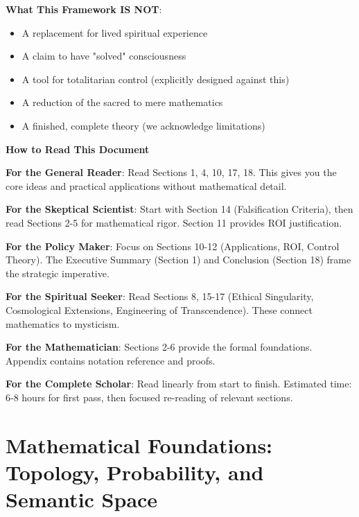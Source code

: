 \documentclass[11pt,a4paper]{article}
\theoremstyle{definition}
\theoremstyle{remark}
\begin{document}
\begin{small}
\begin{mdframed}[backgroundcolor=blue!5,linewidth=2pt]
\vspace{0.5em}

\textbf{What This Framework IS NOT}:
\begin{itemize}[nosep]
    \item A replacement for lived spiritual experience
    \item A claim to have "solved" consciousness
    \item A tool for totalitarian control (explicitly designed against this)
    \item A reduction of the sacred to mere mathematics
    \item A finished, complete theory (we acknowledge limitations)
\end{itemize}
\end{mdframed}

\begin{mdframed}[backgroundcolor=yellow!10,linewidth=2pt]
\textbf{How to Read This Document}

\textbf{For the General Reader}: Read Sections 1, 4, 10, 17, 18. This gives you the core ideas and practical applications without mathematical detail.

\textbf{For the Skeptical Scientist}: Start with Section 14 (Falsification Criteria), then read Sections 2-5 for mathematical rigor. Section 11 provides ROI justification.

\textbf{For the Policy Maker}: Focus on Sections 10-12 (Applications, ROI, Control Theory). The Executive Summary (Section 1) and Conclusion (Section 18) frame the strategic imperative.

\textbf{For the Spiritual Seeker}: Read Sections 8, 15-17 (Ethical Singularity, Cosmological Extensions, Engineering of Transcendence). These connect mathematics to mysticism.

\textbf{For the Mathematician}: Sections 2-6 provide the formal foundations. Appendix contains notation reference and proofs.

\textbf{For the Complete Scholar}: Read linearly from start to finish. Estimated time: 6-8 hours for first pass, then focused re-reading of relevant sections.
\end{mdframed}


\section{Mathematical Foundations: Topology, Probability, and Semantic Space}


\end{small}
\end{document}
